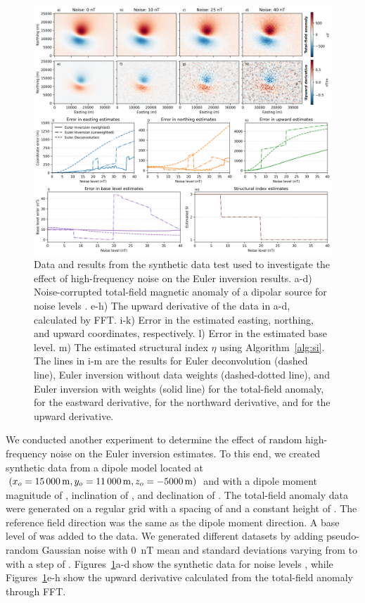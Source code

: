 \begin{figure}[tb!]
\centering
\includegraphics[width=1\linewidth]{figures/synthetic-noise-levels.png}
\caption{
    Data and results from the synthetic data test used to investigate the effect of high-frequency noise on the Euler inversion results.
    a-d) Noise-corrupted total-field magnetic anomaly of a dipolar source for noise levels \SynNoisePlotted.
    e-h) The upward derivative of the data in a-d, calculated by FFT.
    i-k) Error in the estimated easting, northing, and upward coordinates, respectively.
    l) Error in the estimated base level.
    m) The estimated structural index $\eta$ using Algorithm~\ref{alg:si}.
    The lines in i-m are the results for Euler deconvolution (dashed line), Euler inversion without data weights (dashed-dotted line), and Euler inversion with weights (solid line) \SynNoiseWeightsF{} for the total-field anomaly, \SynNoiseWeightsE{} for the eastward derivative, \SynNoiseWeightsN{} for the northward derivative, and \SynNoiseWeightsU{} for the upward derivative.
}
\label{fig:noise}
\end{figure}

We conducted another experiment to determine the effect of random high-frequency noise on the Euler inversion estimates.
To this end, we created synthetic data from a dipole model located at $(x_o=\SynNoiseTrueEast, y_o=\SynNoiseTrueNorth, z_o=\SynNoiseTrueUp)$ and with a dipole moment magnitude of \SynNoiseInt{}, inclination of \SynNoiseInc, and declination of \SynNoiseDec.
The total-field anomaly data were generated on a regular grid with a spacing of \SynNoiseSpacing{} and a constant height of \SynNoiseHeight.
The reference field direction was the same as the dipole moment direction.
A base level of \SynNoiseTrueBase{} was added to the data.
We generated different datasets by adding pseudo-random Gaussian noise with \qty{0}{\nano\tesla} mean and standard deviations varying from \SynNoiseMin{} to \SynNoiseMax{} with a step of \SynNoiseStep{}.
Figures~\ref{fig:noise}a-d show the synthetic data for noise levels \SynNoisePlotted, while Figures~\ref{fig:noise}e-h show the upward derivative calculated from the total-field anomaly through FFT.

